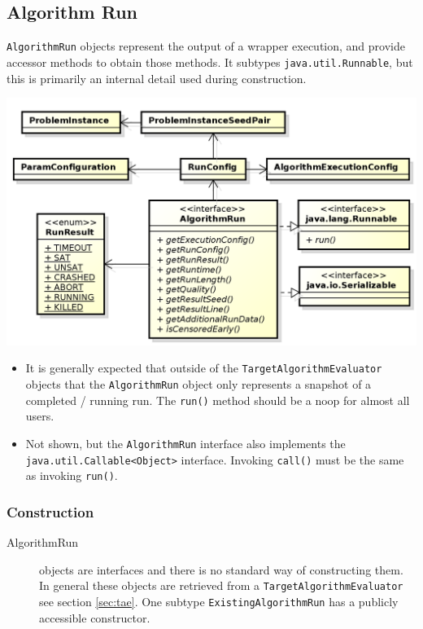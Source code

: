 \documentclass[11pt,letterpaper,oneside]{article}
\begin{document}
\subsection{Algorithm Run} 

\texttt{AlgorithmRun} objects represent the output of a wrapper execution, and provide accessor methods to obtain those methods. It subtypes \texttt{java.util.Runnable}, but this is primarily an internal detail used during construction.

\begin{center}
\includegraphics[scale=0.75]{img/UML/AlgorithmRun.png}
\end{center}

\begin{itemize}
\item It is generally expected that outside of the \texttt{TargetAlgorithmEvaluator} objects that the \texttt{AlgorithmRun} object only represents a snapshot of a completed / running run. The \texttt{run()} method should be a noop for almost all users.
\item  Not shown, but the \texttt{AlgorithmRun} interface also implements the \texttt{java.util.Callable<Object>} interface. Invoking \texttt{call()} must be the same as invoking \texttt{run()}. 
\end{itemize}

\subsubsection{Construction}
\begin{description}
\item[AlgorithmRun] objects are interfaces and there is no standard way of constructing them. In general these objects are retrieved from a \texttt{TargetAlgorithmEvaluator} see section \ref{sec:tae}. One subtype \texttt{ExistingAlgorithmRun} has a publicly accessible constructor.
\end{description}
\end{document}
